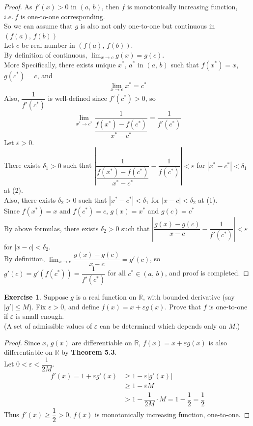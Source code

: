 \documentclass[12pt]{book}
\theoremstyle{definition}
\newtheorem{exercise}{Exercise}
\newcommand{\R}{\mathbb{R}}
\begin{document}
	\begin{proof}
		As $f'(x)>0$ in $(a,\,b)$, then $f$ is monotonically increasing function, $i.e.~f$ is one-to-one corresponding.\\
		So we can assume that $g$ is also not only one-to-one but continuous in $(f(a),\,f(b))$\\
		Let $c$ be real number in $(f(a),\,f(b))$.\\
		By definition of continuous, $\displaystyle\lim_{x\rightarrow c} g(x)=g(c)$.\\
		More Specifically, there exists unique $x^*$, $a^*$ in $(a,\,b)$ such that $f(x^*)=x$, $g(c^*)=c$, and
		\begin{equation}
			\displaystyle\lim_{x\rightarrow c} x^*=c^*
		\end{equation}
		Also, $\dfrac{1}{f'(c^*)}$ is well-defined since $f'(c^*)>0$, so
		\begin{equation}
			\displaystyle\lim_{x^*\rightarrow c^*}\dfrac{1}{\dfrac{f(x^*)-f(c^*)}{x^*-c^*}}=\dfrac{1}{f'(c^*)}
		\end{equation}
		Let $\varepsilon>0$.\\
		There exists $\delta_1>0$ such that $\left\vert\dfrac{1}{\dfrac{f(x^*)-f(c^*)}{x^*-c^*}}-\dfrac{1}{f(c^*)}\right\vert<\varepsilon$ for $|x^*-c^*|<\delta_1$ at (2).\\
		Also, there exists $\delta_2>0$ such that $|x^*-c^*|<\delta_1$ for $|x-c|<\delta_2$ at (1).\\
		Since $f(x^*)=x$ and $f(c^*)=c$, $g(x)=x^*$ and $g(c)=c^*$\\
		By above formulas, there exists $\delta_2>0$ such that $\left\vert\dfrac{g(x)-g(c)}{x-c}-\dfrac{1}{f'(c^*)}\right\vert<\varepsilon$ for $|x-c|<\delta_2$.\\
		By definition, $\displaystyle\lim_{x\rightarrow c}\dfrac{g(x)-g(c)}{x-c}=g'(c)$, so $g'(c)=g'(f(c^*))=\dfrac{1}{f'(c^*)}$ for all $c^*\in (a,\,b)$, and proof is completed.
	\end{proof}
	\newpage
	\begin{exercise}
		Suppose $g$ is a real function on $\R$, with bounded derivative (say $|g'|\leq M$). Fix $\varepsilon >0$, and define $f(x)=x+\varepsilon g(x)$. Prove that $f$ is one-to-one if $\varepsilon$ is small enough.\\
		(A set of admissible values of $\varepsilon$ can be determined which depends only on $M$.)
	\end{exercise}
	\begin{proof}
		Since $x$, $g(x)$ are differentiable on $\R$, $f(x)=x+\varepsilon g(x)$ is also differentiable on $\R$ by \textbf{Theorem 5.3}.\\
		Let $0<\varepsilon<\dfrac{1}{2M}$.\\
		\begin{align*}
			f'(x)=1+\varepsilon g'(x) &\geq 1-\varepsilon |g'(x)|\\
			&\geq 1-\varepsilon M\\
			&>1-\dfrac{1}{2M}\cdot M=1-\dfrac{1}{2}=\dfrac{1}{2}
		\end{align*}
		Thus $f'(x)\geq\dfrac{1}{2}>0$, $f(x)$ is monotonically increasing function, one-to-one.
	\end{proof}
\end{document}
